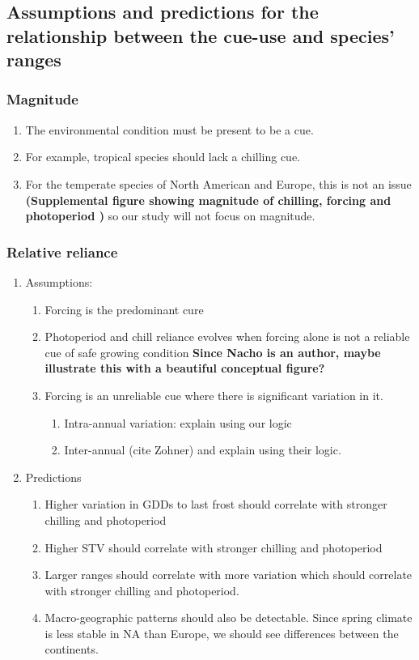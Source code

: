\documentclass[11pt]{article}\usepackage[]{graphicx}\usepackage[]{color}
\begin{document}
\subsection*{Assumptions and predictions for the relationship between the cue-use and species' ranges}
\subsubsection{Magnitude}
\begin{enumerate}
\item The environmental condition must be present to be a cue.
\item For example, tropical species should lack a chilling cue.
\item For the temperate species of North American and Europe, this is not an issue \textbf{(Supplemental figure showing magnitude of chilling, forcing and photoperiod )} so our study will not focus on magnitude.
\end{enumerate}
\subsubsection{Relative reliance}
\begin{enumerate}
\item Assumptions:
\begin{enumerate}
\item Forcing is the predominant cure
\item Photoperiod and chill reliance evolves when forcing alone is not a reliable cue of safe growing condition \textbf{Since Nacho is an author, maybe illustrate this with a beautiful conceptual figure?}
\item Forcing is an unreliable cue where there is significant variation in it.
\begin{enumerate}
\item Intra-annual variation: explain using our logic 
\item Inter-annual (cite Zohner) and explain using their logic.
\end{enumerate}
\end{enumerate}
\item Predictions
\begin{enumerate}
\item Higher variation in GDDs to last frost should correlate with stronger chilling and photoperiod
\item Higher STV should correlate with stronger chilling and photoperiod
\item Larger ranges should correlate with more variation which should correlate with stronger chilling and photoperiod.
\item Macro-geographic patterns should also be detectable. Since spring climate is less stable in NA than Europe, we should see differences between the continents.
\end{enumerate}
\end{enumerate}
\end{document}
